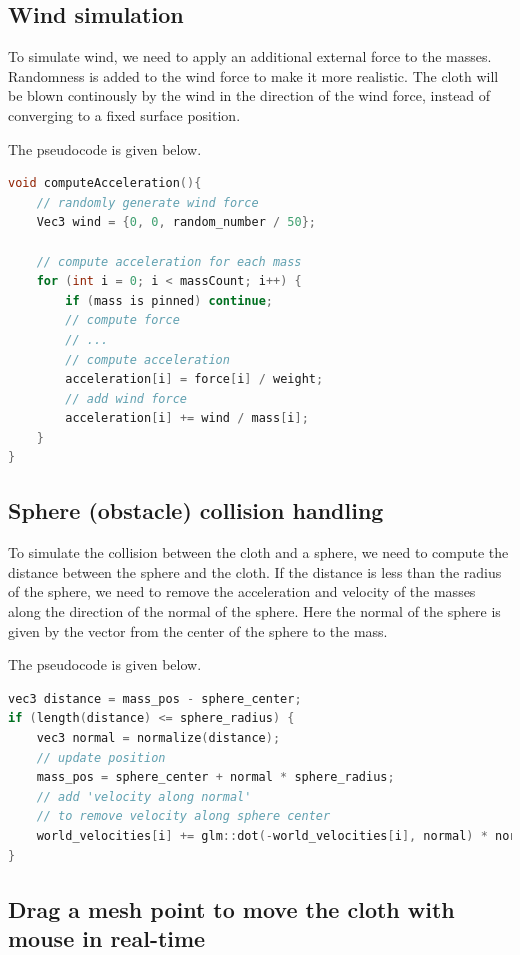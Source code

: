 \documentclass[acmtog]{acmart}
\begin{document}
\subsection{Wind simulation}

To simulate wind, we need to apply an additional external force to the masses. Randomness is added to the wind force to make it more realistic. The cloth will be blown continously by the wind in the direction of the wind force, instead of converging to a fixed surface position.

The pseudocode is given below.

\begin{lstlisting}[language=C++, caption=Wind simulation]
void computeAcceleration(){
	// randomly generate wind force
	Vec3 wind = {0, 0, random_number / 50};

	// compute acceleration for each mass
	for (int i = 0; i < massCount; i++) {
		if (mass is pinned) continue;
		// compute force
		// ...
		// compute acceleration
		acceleration[i] = force[i] / weight;
		// add wind force
		acceleration[i] += wind / mass[i];
	}
}
\end{lstlisting}

\subsection{Sphere (obstacle) collision handling}

To simulate the collision between the cloth and a sphere, we need to compute the distance between the sphere and the cloth. If the distance is less than the radius of the sphere, we need to remove the acceleration and velocity of the masses along the direction of the normal of the sphere. Here the normal of the sphere is given by the vector from the center of the sphere to the mass.

The pseudocode is given below.

\begin{lstlisting}[language=C++, caption=Sphere collision handling]
vec3 distance = mass_pos - sphere_center;
if (length(distance) <= sphere_radius) {
	vec3 normal = normalize(distance);
	// update position
	mass_pos = sphere_center + normal * sphere_radius;
	// add 'velocity along normal' 
	// to remove velocity along sphere center
	world_velocities[i] += glm::dot(-world_velocities[i], normal) * normal;  
}
\end{lstlisting}

\subsection{Drag a mesh point to move the cloth with mouse in real-time}
\end{document}
